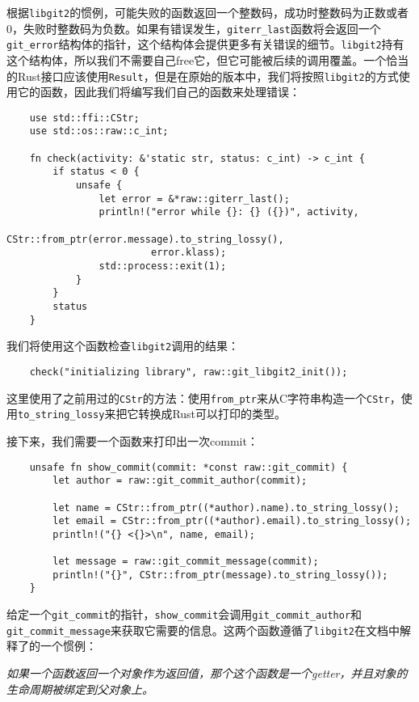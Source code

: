 根据\texttt{libgit2}的惯例，可能失败的函数返回一个整数码，成功时整数码为正数或者0，失败时整数码为负数。如果有错误发生，\texttt{giterr\_last}函数将会返回一个\texttt{git\_error}结构体的指针，这个结构体会提供更多有关错误的细节。\texttt{libgit2}持有这个结构体，所以我们不需要自己free它，但它可能被后续的调用覆盖。一个恰当的Rust接口应该使用\texttt{Result}，但是在原始的版本中，我们将按照\texttt{libgit2}的方式使用它的函数，因此我们将编写我们自己的函数来处理错误：
\begin{verbatim}
    use std::ffi::CStr;
    use std::os::raw::c_int;

    fn check(activity: &'static str, status: c_int) -> c_int {
        if status < 0 {
            unsafe {
                let error = &*raw::giterr_last();
                println!("error while {}: {} ({})", activity,
                         CStr::from_ptr(error.message).to_string_lossy(),
                         error.klass);
                std::process::exit(1);
            }
        }
        status
    }
\end{verbatim}

我们将使用这个函数检查\texttt{libgit2}调用的结果：
\begin{verbatim}
    check("initializing library", raw::git_libgit2_init());
\end{verbatim}

这里使用了之前用过的\texttt{CStr}的方法：使用\texttt{from\_ptr}来从C字符串构造一个\texttt{CStr}，使用\texttt{to\_string\_lossy}来把它转换成Rust可以打印的类型。

接下来，我们需要一个函数来打印出一次commit：
\begin{verbatim}
    unsafe fn show_commit(commit: *const raw::git_commit) {
        let author = raw::git_commit_author(commit);

        let name = CStr::from_ptr((*author).name).to_string_lossy();
        let email = CStr::from_ptr((*author).email).to_string_lossy();
        println!("{} <{}>\n", name, email);

        let message = raw::git_commit_message(commit);
        println!("{}", CStr::from_ptr(message).to_string_lossy());
    }
\end{verbatim}

给定一个\texttt{git\_commit}的指针，\texttt{show\_commit}会调用\texttt{git\_commit\_author}和\texttt{git\_commit\_message}来获取它需要的信息。这两个函数遵循了\texttt{libgit2}在文档中解释了的一个惯例：

\emph{如果一个函数返回一个对象作为返回值，那个这个函数是一个getter，并且对象的生命周期被绑定到父对象上。}

